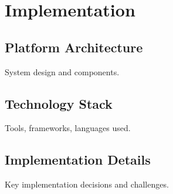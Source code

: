 \chapter{Implementation}
\label{ch:implementation}

\section{Platform Architecture}

System design and components.

\section{Technology Stack}

Tools, frameworks, languages used.

\section{Implementation Details}

Key implementation decisions and challenges.

